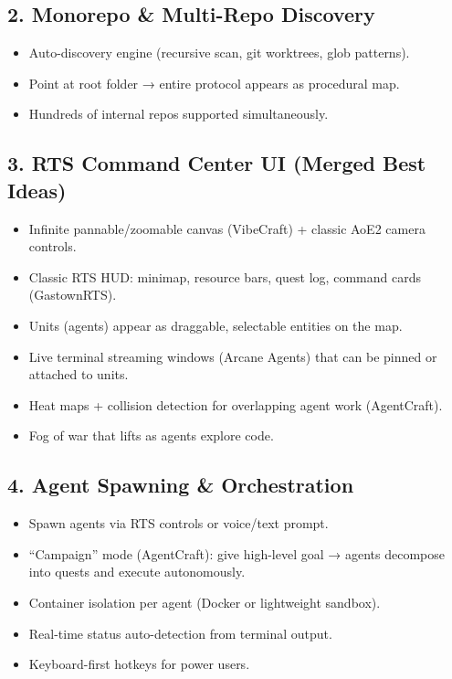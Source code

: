 \documentclass[11pt,a4paper]{article}
\begin{document}
\subsection{2. Monorepo \& Multi-Repo Discovery}
\begin{itemize}
    \item Auto-discovery engine (recursive scan, git worktrees, glob patterns).
    \item Point at root folder → entire protocol appears as procedural map.
    \item Hundreds of internal repos supported simultaneously.
\end{itemize}

\subsection{3. RTS Command Center UI (Merged Best Ideas)}
\begin{itemize}
    \item Infinite pannable/zoomable canvas (VibeCraft) + classic AoE2 camera controls.
    \item Classic RTS HUD: minimap, resource bars, quest log, command cards (GastownRTS).
    \item Units (agents) appear as draggable, selectable entities on the map.
    \item Live terminal streaming windows (Arcane Agents) that can be pinned or attached to units.
    \item Heat maps + collision detection for overlapping agent work (AgentCraft).
    \item Fog of war that lifts as agents explore code.
\end{itemize}

\subsection{4. Agent Spawning \& Orchestration}
\begin{itemize}
    \item Spawn agents via RTS controls or voice/text prompt.
    \item ``Campaign'' mode (AgentCraft): give high-level goal → agents decompose into quests and execute autonomously.
    \item Container isolation per agent (Docker or lightweight sandbox).
    \item Real-time status auto-detection from terminal output.
    \item Keyboard-first hotkeys for power users.
\end{itemize}
\end{document}
